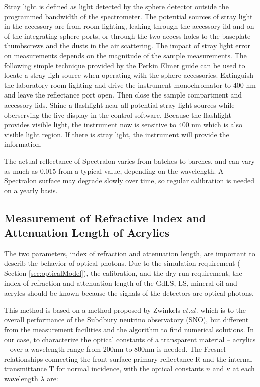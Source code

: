 Stray light is defined as light detected by the sphere detector outside the programmed bandwidth of the spectrometer.
The potential sources of stray light in the accessory are from
room lighting, leaking through the accessory ild and on of the integrating sphere ports, or
through the two access holes to the baseplate thumbscrews and the dusts in the air scattering.
The impact of stray light error on measurements depends on the magnitude of the sample measurements.
The following simple technique provided by the Perkin Elmer guide can be used to locate a stray ligh source when operating with
the sphere accessories. Extinguish the laboratory room lighting and drive the instrument monochromator to 400 nm and leave the reflectance port open.
Then close the sample compartment and accessory lids. Shine a flashlight near all potential stray light sources while oberserving the live display in the
control software. Because the flashlight provides visible light, the instrument now is sensitive to 400 nm which is also visible light region. If there is stray light, the instrument will provide the information.

The actual reflectance of Spectralon varies from batches to barches, and can vary as much as 0.015 from a typical value, depending on the wavelength.
A Spectralon surface may degrade slowly over time, so regular calibration is needed on a yearly basis.


\subsection {Measurement of Refractive Index and Attenuation Length of Acrylics}
\label {sec:RTMethod}

The two parameters, index of refraction and attenuation length, are important
to describ the behavior of optical photons.
Due to the simulation requirement ( Section \ref{sec:opticalModel}), the calibration, and the dry run requirement,
the index of refraction and attenuation length
of the GdLS, LS, mineral oil and acrylcs should be known because the signals of the detectors
are optical photons.




This method is based on a method proposed by Zwinkels $et. al.$ \cite{RTMethod} which
is to the overall performance of the Subdbury neutrino observatory (SNO),
but different from the measurement facilities and the algorithm to find numerical solutions.
In our case, to characterize the optical constants of a
transparent material -- acrylics -- over a wavelength range from 200nm to 800nm is needed.
The Fresnel relationships connecting the front-surface
primary reflectance R and the internal transmittance T for normal incidence, with the optical constants $n$ and $\kappa$ at each wavelength $\lambda$
are:


